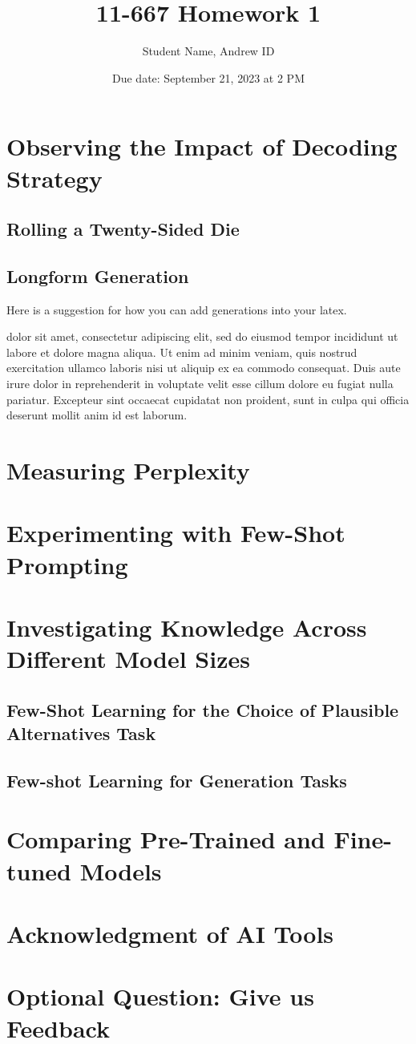 \documentclass[11pt,a4paper]{article}
\begin{document}
 

\title{11-667 Homework 1}
\author{Student Name, Andrew ID}
\date{Due date: September 21, 2023 at 2 PM}
\maketitle

\section{Observing the Impact of Decoding Strategy}
\subsection{Rolling a Twenty-Sided Die}
\subsection{Longform Generation}

Here is a suggestion for how you can add generations into your latex.
\begin{tcolorbox}[width=\textwidth,title={Prompt=Lorem ipsum, top-p=0},]
dolor sit amet, consectetur adipiscing elit, sed do eiusmod tempor incididunt ut labore et dolore magna aliqua. Ut enim ad minim veniam, quis nostrud exercitation ullamco laboris nisi ut aliquip ex ea commodo consequat. Duis aute irure dolor in reprehenderit in voluptate velit esse cillum dolore eu fugiat nulla pariatur. Excepteur sint occaecat cupidatat non proident, sunt in culpa qui officia deserunt mollit anim id est laborum.
\end{tcolorbox}

\section{Measuring Perplexity}

\section{Experimenting with Few-Shot Prompting}

\section{Investigating Knowledge Across Different Model Sizes}
\subsection{Few-Shot Learning for the Choice of Plausible Alternatives Task}
\subsection{Few-shot Learning for Generation Tasks}

\section{Comparing Pre-Trained and Fine-tuned Models}

\section{Acknowledgment of AI Tools}

\section{Optional Question: Give us Feedback}
\end{document}
